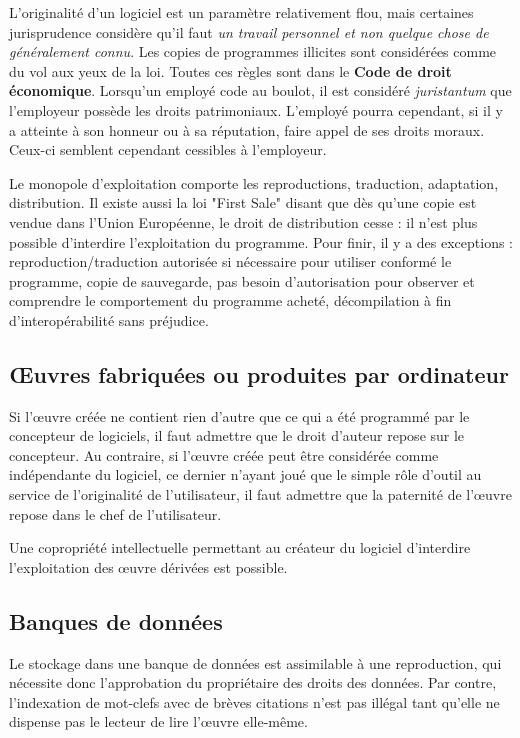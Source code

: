 \documentclass[fleqn,letterpaper, 12pt]{article}
\begin{document}
	L'originalité d'un logiciel est un paramètre relativement flou, mais certaines jurisprudence considère qu'il faut \emph{un travail personnel et non quelque chose de généralement connu}. Les copies de programmes illicites sont considérées comme du vol aux yeux de la loi. Toutes ces règles sont dans le \textbf{Code de droit économique}. Lorsqu'un employé code au boulot, il est considéré \emph{juristantum} que l'employeur possède les droits patrimoniaux. L'employé pourra cependant, si il y a atteinte à son honneur ou à sa réputation, faire appel de ses droits moraux. Ceux-ci semblent cependant cessibles à l'employeur.
	
	Le monopole d'exploitation comporte les reproductions, traduction, adaptation, distribution. Il existe aussi la loi "First Sale" disant que dès qu'une copie est vendue dans l'Union Européenne, le droit de distribution cesse : il n'est plus possible d'interdire l'exploitation du programme. Pour finir, il y a des exceptions : reproduction/traduction autorisée si nécessaire pour utiliser conformé le programme, copie de sauvegarde, pas besoin d'autorisation pour observer et comprendre le comportement du programme acheté, décompilation à fin d'interopérabilité sans préjudice.
	
	
	
	\subsection{Œuvres fabriquées ou produites par ordinateur}
	
	Si l’œuvre créée ne contient rien d'autre que ce qui a été programmé par le concepteur de logiciels, il faut admettre que le droit d'auteur repose sur le concepteur. Au contraire, si l’œuvre créée peut être considérée comme indépendante du logiciel, ce dernier n'ayant joué que le simple rôle d'outil au service de l'originalité de l'utilisateur, il faut admettre que la paternité de l'œuvre repose dans le chef de l'utilisateur.
	
	Une copropriété intellectuelle permettant au créateur du logiciel d'interdire l'exploitation des œuvre dérivées est possible.
	
	
	\subsection{Banques de données}
	
	Le stockage dans une banque de données est assimilable à une reproduction, qui nécessite donc l'approbation du propriétaire des droits des données. Par contre, l'indexation de mot-clefs avec de brèves citations n'est pas illégal tant qu'elle ne dispense pas le lecteur de lire l'œuvre elle-même.
	
\end{document}
